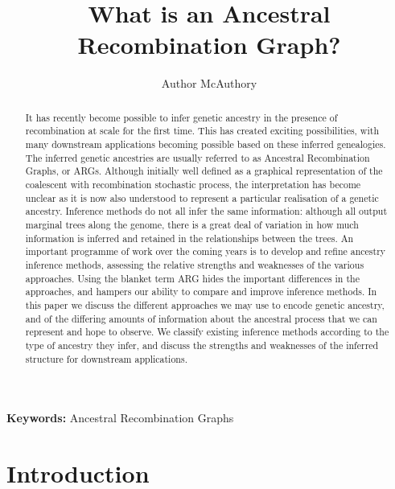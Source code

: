 \documentclass{article}
\begin{document}
\linenumbers
\title{What is an Ancestral Recombination Graph?}
\author{Author McAuthory}

\maketitle

\begin{abstract}
It has recently become possible to infer genetic ancestry in the presence of
recombination at scale for the first time. This has created exciting
possibilities, with many downstream applications becoming possible based on
these inferred genealogies. The inferred genetic ancestries are usually
referred to as Ancestral Recombination Graphs, or ARGs. Although initially well
defined as a graphical representation of the coalescent with recombination
stochastic process, the interpretation has become unclear as it is now
also understood to represent a particular realisation of a genetic
ancestry.
Inference methods do not all infer the same information:
although all output marginal trees along the genome, there is a great deal of
variation in how much information is inferred and retained in the relationships
between the trees. An important programme of work over the coming years is to
develop and refine ancestry inference methods, assessing the relative strengths
and weaknesses of the various approaches. Using the blanket term ARG hides the
important differences in the approaches, and hampers our ability to compare and
improve inference methods. In this paper we discuss the different approaches we
may use to encode genetic ancestry, and of the differing amounts of information
about the ancestral process that we can represent and hope to observe. We
classify existing inference methods according to the type of ancestry they
infer, and discuss the strengths and weaknesses of the inferred structure for
downstream applications.
\end{abstract}

\textbf{Keywords:} Ancestral Recombination Graphs

\section*{Introduction}

\end{document}
